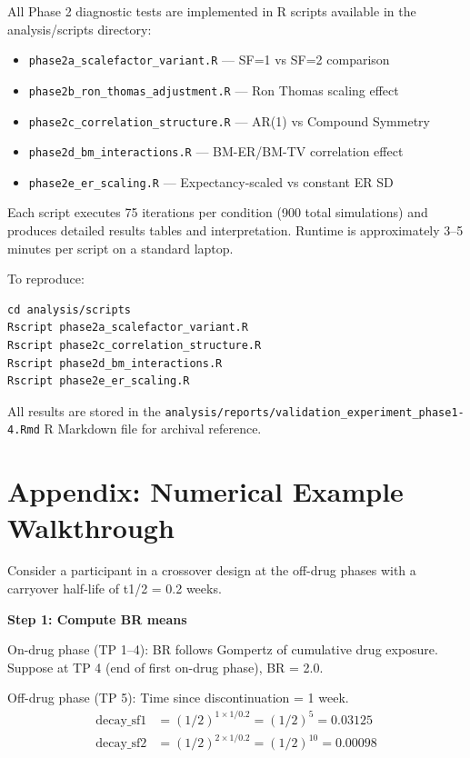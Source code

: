 \documentclass[12pt,a4paper]{article}
\begin{document}
All Phase 2 diagnostic tests are implemented in R scripts available in the analysis/scripts directory:

\begin{itemize}
\item \texttt{phase2a\_scalefactor\_variant.R} --- SF=1 vs SF=2 comparison
\item \texttt{phase2b\_ron\_thomas\_adjustment.R} --- Ron Thomas scaling effect
\item \texttt{phase2c\_correlation\_structure.R} --- AR(1) vs Compound Symmetry
\item \texttt{phase2d\_bm\_interactions.R} --- BM-ER/BM-TV correlation effect
\item \texttt{phase2e\_er\_scaling.R} --- Expectancy-scaled vs constant ER SD
\end{itemize}

Each script executes 75 iterations per condition (900 total simulations) and produces detailed results tables and interpretation. Runtime is approximately 3--5 minutes per script on a standard laptop.

To reproduce:
\begin{verbatim}
cd analysis/scripts
Rscript phase2a_scalefactor_variant.R
Rscript phase2c_correlation_structure.R
Rscript phase2d_bm_interactions.R
Rscript phase2e_er_scaling.R
\end{verbatim}

All results are stored in the \texttt{analysis/reports/validation\_experiment\_phase1-4.Rmd} R Markdown file for archival reference.

\section{Appendix: Numerical Example Walkthrough}

Consider a participant in a crossover design at the off-drug phases with a carryover half-life of t1/2 = 0.2 weeks.

\textbf{Step 1: Compute BR means}

On-drug phase (TP 1--4): BR follows Gompertz of cumulative drug exposure. Suppose at TP 4 (end of first on-drug phase), BR = 2.0.

Off-drug phase (TP 5): Time since discontinuation = 1 week.
\begin{align}
\text{decay\_sf1} &= (1/2)^{1 \times 1 / 0.2} = (1/2)^5 = 0.03125\\
\text{decay\_sf2} &= (1/2)^{2 \times 1 / 0.2} = (1/2)^{10} = 0.00098
\end{align}
\end{document}
